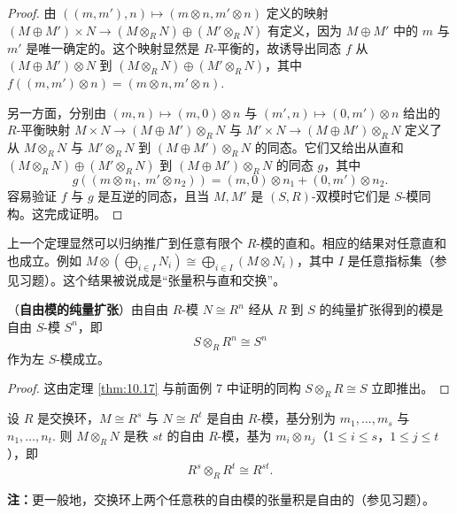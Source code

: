 \begin{proof}
由 \(((m, m'), n) \mapsto (m \otimes n, m' \otimes n)\) 定义的映射 \((M \oplus M') \times N \to (M \otimes_R N) \oplus (M' \otimes_R N)\) 有定义，因为 \(M \oplus M'\) 中的 \(m\) 与 \(m'\) 是唯一确定的。这个映射显然是 \(R\)-平衡的，故诱导出同态 \(f\) 从 \((M \oplus M') \otimes N\) 到 \((M \otimes_R N) \oplus (M' \otimes_R N)\)，其中 \(f((m, m') \otimes n) = (m \otimes n, m' \otimes n)\).

另一方面，分别由 \((m, n) \mapsto (m, 0) \otimes n\) 与 \((m', n) \mapsto (0, m') \otimes n\) 给出的 \(R\)-平衡映射 \(M \times N \to (M \oplus M') \otimes_R N\) 与 \(M' \times N \to (M \oplus M') \otimes_R N\) 定义了从 \(M \otimes_R N\) 与 \(M' \otimes_R N\) 到 \((M \oplus M') \otimes_R N\) 的同态。它们又给出从直和 \((M \otimes_R N) \oplus (M' \otimes_R N)\) 到 \((M \oplus M') \otimes_R N\) 的同态 \(g\)，其中
\[
g((m \otimes n_1,\ m' \otimes n_2)) = (m, 0) \otimes n_1 + (0, m') \otimes n_2.
\]
容易验证 \(f\) 与 \(g\) 是互逆的同态，且当 \(M, M'\) 是 \((S, R)\)-双模时它们是 \(S\)-模同构。这完成证明。
\end{proof}

上一个定理显然可以归纳推广到任意有限个 \(R\)-模的直和。相应的结果对任意直和也成立。例如 \(M \otimes (\bigoplus_{i \in I} N_i) \cong \bigoplus_{i \in I}(M \otimes N_i)\)，其中 \(I\) 是任意指标集（参见习题）。这个结果被说成是“张量积与直和交换”。

\begin{corollary}\label{cor:10.18}
（\textbf{自由模的纯量扩张}）由自由 \(R\)-模 \(N \cong R^n\) 经从 \(R\) 到 \(S\) 的纯量扩张得到的模是自由 \(S\)-模 \(S^n\)，即
\[
S \otimes_R R^n \cong S^n
\]
作为左 \(S\)-模成立。
\end{corollary}

\begin{proof}
这由定理 \ref{thm:10.17} 与前面例 7 中证明的同构 \(S \otimes_R R \cong S\) 立即推出。
\end{proof}

\begin{corollary}\label{cor:10.19}
设 \(R\) 是交换环，\(M \cong R^s\) 与 \(N \cong R^t\) 是自由 \(R\)-模，基分别为 \(m_1, \ldots, m_s\) 与 \(n_1, \ldots, n_t\). 则 \(M \otimes_R N\) 是秩 \(st\) 的自由 \(R\)-模，基为 \(m_i \otimes n_j\)（\(1 \leq i \leq s\)，\(1 \leq j \leq t\)），即
\[
R^s \otimes_R R^t \cong R^{st}.
\]
\end{corollary}

\noindent\textbf{注：}更一般地，交换环上两个任意秩的自由模的张量积是自由的（参见习题）。

